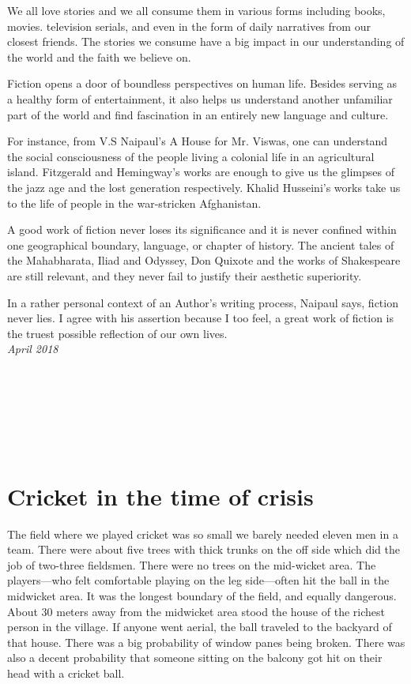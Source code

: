 \documentclass[oneside,12pt]{book}
\begin{document}
We all love stories and we all consume them in various forms including books, movies. television serials, and even in the form of daily narratives from our closest friends. The stories we consume have a big impact in our understanding of the world and the faith we believe on. 

Fiction opens a door of boundless perspectives on human life. Besides serving as a healthy form of entertainment, it also helps us understand another unfamiliar part of the world and find fascination in an entirely new language and culture. 

For instance, from V.S Naipaul’s A House for Mr. Viswas, one can understand the social consciousness of the people living a colonial life in an agricultural island. Fitzgerald and Hemingway’s works are enough to give us the glimpses of the jazz age and the lost generation respectively.  Khalid Husseini’s works take us to the life of people in the war-stricken Afghanistan. 

A good work of fiction never loses its significance and it is never confined within one geographical boundary, language, or chapter of history. The ancient tales of the Mahabharata, Iliad and Odyssey, Don Quixote and the works of Shakespeare are still relevant, and they never fail to justify their aesthetic superiority.

In a rather personal context of an Author’s writing process, Naipaul says, fiction never lies. I agree with his assertion because I too feel, a great work of fiction is the truest possible reflection of our own lives. \\

\textit{April 2018} \\\\\\\\\\\\\

\section*{Cricket in the time of crisis}
The field where we played cricket was so small we barely needed eleven men in a team. There were about five trees with thick trunks on the off side which did the job of two-three fieldsmen. There were no trees on the mid-wicket area. The players—who felt comfortable playing on the leg side—often hit the ball in the midwicket area. It was the longest boundary of the field, and equally dangerous. About 30 meters away from the midwicket area stood the house of the richest person in the village. If anyone went aerial, the ball traveled to the backyard of that house. There was a big probability of window panes being broken. There was also a decent probability that someone sitting on the balcony got hit on their head with a cricket ball. 
\end{document}
